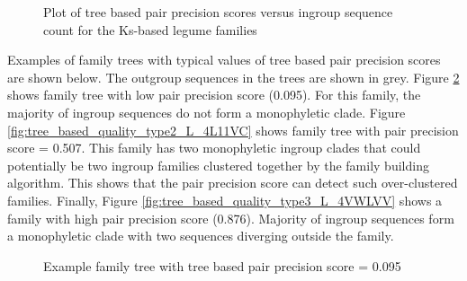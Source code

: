 \documentclass{article}
\begin{document}
		\begin{figure}[h!]
			\caption{Plot of tree based pair precision scores versus ingroup sequence count for the Ks-based legume families}
			\label{fig:scatter_tree_precision_vs_seqct_lgf5}
		\end{figure}
		
		Examples of family trees with typical values of tree based pair precision scores are shown below. The outgroup sequences in the trees are shown in grey. Figure \ref{fig:tree_based_quality_type1_L_J5W12Z} shows family tree with low pair precision score (0.095). For this family, the majority of ingroup sequences do not form a monophyletic clade. Figure \ref{fig:tree_based_quality_type2_L_4L11VC} shows family tree with pair precision score = 0.507. This family has two monophyletic ingroup clades that could potentially be two ingroup families clustered together by the family building algorithm. This shows that the pair precision score can detect such over-clustered families. Finally, Figure  \ref{fig:tree_based_quality_type3_L_4VWLVV} shows a family with high pair precision score (0.876). Majority of ingroup  sequences form a monophyletic clade with two sequences diverging outside the family.
		
			
		\begin{figure}[h!]
			\caption{Example family tree with tree based pair precision score = 0.095}
			\label{fig:tree_based_quality_type1_L_J5W12Z}
		\end{figure}
		
\end{document}
